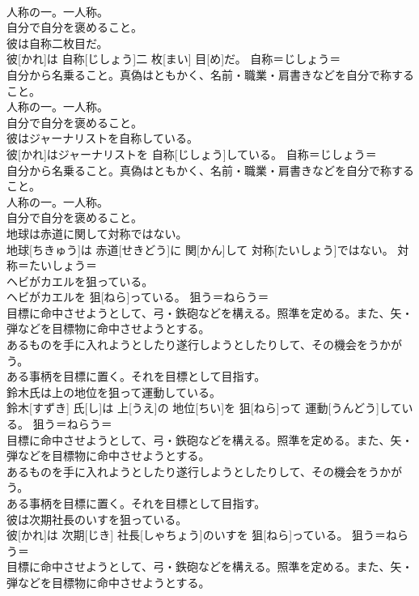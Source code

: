 \documentclass[8pt]{extreport}
\begin{document}
\begin{CJK}{UTF8}{min}
{\\	人称の一。一人称。 
\\	自分で自分を褒めること。
\\	彼は自称二枚目だ。	
\\	彼[かれ]は 自称[じしょう]二 枚[まい] 目[め]だ。	自称＝じしょう＝ 
\\	自分から名乗ること。真偽はともかく、名前・職業・肩書きなどを自分で称すること。 
\\	人称の一。一人称。 
\\	自分で自分を褒めること。
\\	彼はジャーナリストを自称している。	
\\	彼[かれ]はジャーナリストを 自称[じしょう]している。	自称＝じしょう＝ 
\\	自分から名乗ること。真偽はともかく、名前・職業・肩書きなどを自分で称すること。 
\\	人称の一。一人称。 
\\	自分で自分を褒めること。
\\	地球は赤道に関して対称ではない。	
\\	地球[ちきゅう]は 赤道[せきどう]に 関[かん]して 対称[たいしょう]ではない。	対称＝たいしょう＝ 
\\	ヘビがカエルを狙っている。	
\\	ヘビがカエルを 狙[ねら]っている。	狙う＝ねらう＝ 
\\	目標に命中させようとして、弓・鉄砲などを構える。照準を定める。また、矢・弾などを目標物に命中させようとする。 
\\	あるものを手に入れようとしたり遂行しようとしたりして、その機会をうかがう。 
\\	ある事柄を目標に置く。それを目標として目指す。
\\	鈴木氏は上の地位を狙って運動している。	
\\	鈴木[すずき] 氏[し]は 上[うえ]の 地位[ちい]を 狙[ねら]って 運動[うんどう]している。	狙う＝ねらう＝ 
\\	目標に命中させようとして、弓・鉄砲などを構える。照準を定める。また、矢・弾などを目標物に命中させようとする。 
\\	あるものを手に入れようとしたり遂行しようとしたりして、その機会をうかがう。 
\\	ある事柄を目標に置く。それを目標として目指す。
\\	彼は次期社長のいすを狙っている。	
\\	彼[かれ]は 次期[じき] 社長[しゃちょう]のいすを 狙[ねら]っている。	狙う＝ねらう＝ 
\\	目標に命中させようとして、弓・鉄砲などを構える。照準を定める。また、矢・弾などを目標物に命中させようとする。 
}
\end{CJK}
\end{document}
